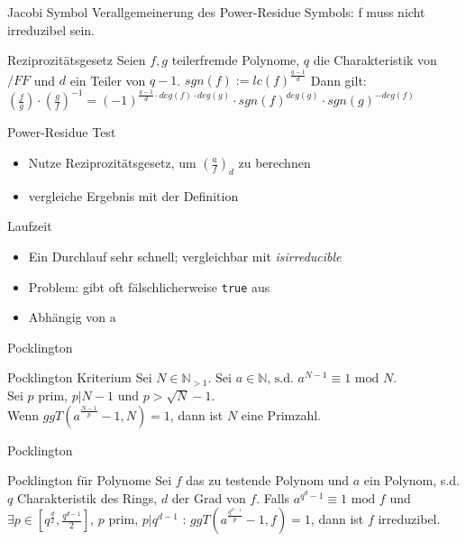 \documentclass[german,10pt,xcolor=colortbl,compress]{beamer}%
\newcommand{\NN}{\mathbb{N}}
\begin{document}
	
	\begin{frame}{Jacobi Symbol}
		Verallgemeinerung des Power-Residue Symbols: f muss nicht irreduzibel sein.
		
		\begin{block}{Reziprozitätsgesetz}
			Seien $f,g$ teilerfremde Polynome, $q$ die Charakteristik von $/FF$ und $d$ ein Teiler von $q-1$.
			$sgn(f):=lc(f)^{\frac{q-1}{d}}$ 
			Dann gilt:
			$\left(\frac{f}{g}\right) \cdot \left(\frac{g}{f}\right)^{-1} = (-1)^{\frac{q-1}{d} \cdot deg(f)\cdot deg(g)}\cdot sgn(f)^{deg(g)} \cdot sgn(g)^{-deg(f)} $
							
		\end{block}
	\end{frame}

	
	\begin{frame}{Power-Residue Test}
		\begin{itemize}
		\item Nutze Reziprozitätsgesetz, um $(\frac{a}{f})_d $ zu berechnen
		\item vergleiche Ergebnis mit der Definition
		\end{itemize}
	\end{frame}

	
	\begin{frame}{Laufzeit}
		\begin{itemize}
			\item Ein Durchlauf sehr schnell; vergleichbar mit \textit{isirreducible}
			\item Problem: gibt oft fälschlicherweise \texttt{true} aus
			\item Abhängig von a
		\end{itemize}
	\end{frame}

	
	\begin{frame}{Pocklington}
		\begin{block}{Pocklington Kriterium}
			Sei $N\in \NN_{>1}$. $%
			\text{Sei } a \in \NN \text{, s.d. } a^{N-1} \equiv 1 \text{ mod } N$.\\
			Sei $p$ prim, $p | N-1$ und $p> \sqrt{N}-1$.\\
			Wenn $ggT(a^{\frac{N-1}{p}}-1,N) = 1$, dann ist $N$ eine Primzahl.
		\end{block}
	\end{frame}

		
	\begin{frame}{Pocklington}
		\begin{block}{Pocklington für Polynome}
			Sei $f$ das zu testende Polynom und $a$ ein Polynom, s.d. 
			$q$ Charakteristik des Rings, $d$ der Grad von $f$.
			Falls $a^{q^{d}-1}\equiv 1 \text{ mod }f$ und 
			$\exists p \in [q^{\frac{d}{2}}, \frac{q^{d-1}}{2}]\text{, } p \text{ prim, } p|q^{d-1} $ : $ggT(a^{\frac{q^{d-1}}{p}}-1, f)=1$, dann ist $f$ irreduzibel. 
			
			
			
		\end{block}
	\end{frame}
\end{document}
